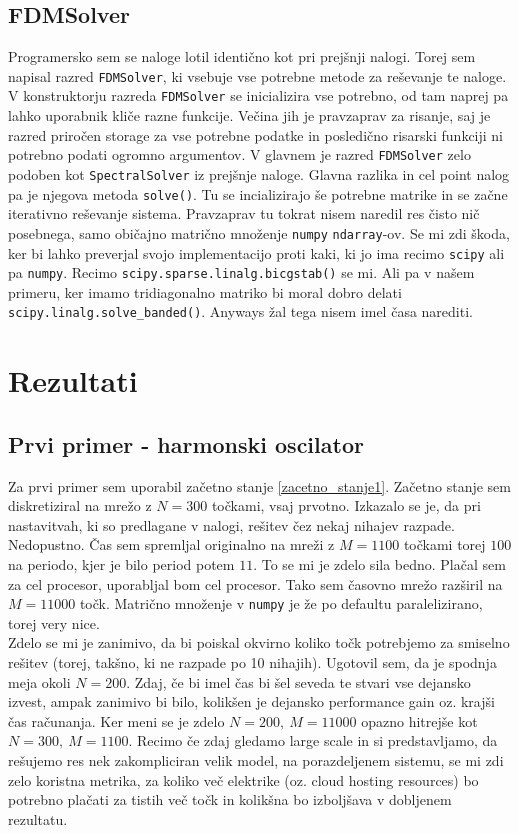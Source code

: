\documentclass[a4paper]{article}
\begin{document}
\subsection{FDMSolver}
Programersko sem se naloge lotil identično kot pri prejšnji nalogi. Torej sem napisal razred \texttt{FDMSolver},
ki vsebuje vse potrebne metode za reševanje te naloge. V konstruktorju razreda \texttt{FDMSolver} se inicializira
vse potrebno, od tam naprej pa lahko uporabnik kliče razne funkcije. Večina jih je pravzaprav za risanje, saj je 
razred priročen storage za vse potrebne podatke in posledično risarski funkciji ni potrebno podati ogromno argumentov.
V glavnem je razred \texttt{FDMSolver} zelo podoben kot \texttt{SpectralSolver} iz prejšnje naloge. Glavna razlika
in cel point nalog pa je njegova metoda \texttt{solve()}. Tu se incializirajo še potrebne matrike in se začne iterativno
reševanje sistema. Pravzaprav tu tokrat nisem naredil res čisto nič posebnega, samo običajno matrično množenje
\texttt{numpy} \texttt{ndarray}-ov. Se mi zdi škoda, ker bi lahko preverjal svojo implementacijo proti kaki, ki jo 
ima recimo \texttt{scipy} ali pa \texttt{numpy}. Recimo \texttt{scipy.sparse.linalg.bicgstab()} se mi. Ali pa v našem
primeru, ker imamo tridiagonalno matriko bi moral dobro delati \texttt{scipy.linalg.solve\_banded()}. 
Anyways žal tega nisem imel časa narediti.\\

\section{Rezultati}
\subsection{Prvi primer - harmonski oscilator}
Za prvi primer sem uporabil začetno stanje \ref{zacetno_stanje1}. 
Začetno stanje sem diskretiziral na mrežo z $N=300$ točkami, vsaj prvotno. Izkazalo se je,
da pri nastavitvah, ki so predlagane v nalogi, rešitev čez nekaj nihajev razpade. Nedopustno.
Čas sem spremljal originalno na mreži z 
$M=1100$ točkami torej $100$ na periodo, kjer je bilo period potem $11$. To se mi je zdelo sila bedno. 
Plačal sem za cel procesor, uporabljal bom cel procesor. Tako sem časovno mrežo razširil na $M=11000$ točk.
Matrično množenje v \texttt{numpy} je že po defaultu paralelizirano, torej very nice. \\

Zdelo se mi je zanimivo, da bi poiskal okvirno koliko točk potrebjemo za smiselno rešitev (torej, takšno,
ki ne razpade po 10 nihajih). Ugotovil sem, da je spodnja meja okoli $N=200$. Zdaj, če bi imel čas 
bi šel seveda te stvari vse dejansko izvest, ampak zanimivo bi bilo, kolikšen je dejansko performance
gain oz. krajši čas računanja. Ker meni se je zdelo $N = 200,\> M = 11000$ opazno hitrejše kot 
$N = 300,\> M = 1100$. Recimo če zdaj gledamo large scale in si predstavljamo, da rešujemo res nek 
zakompliciran velik model, na porazdeljenem sistemu, se mi zdi zelo koristna metrika, za koliko 
več elektrike (oz. cloud hosting resources) bo potrebno plačati za tistih več točk in
kolikšna bo izboljšava v dobljenem rezultatu. \\
\end{document}
